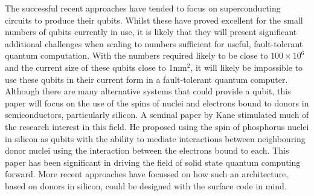 The successful recent approaches have tended to focus on superconducting circuits to produce their qubits. 
Whilst these have proved excellent for the small numbers of qubits currently in use, it is likely that they will present significant additional challenges when scaling to numbers sufficient for useful, fault-tolerant quantum computation.
With the numbers required likely to be close to $100 \times 10^6$ and the current size of these qubits close to 1mm$^2$, it will likely be impossible to use these qubits in their current form in a fault-tolerant quantum computer.
\\
Although there are many alternative systems that could provide a qubit, this paper will focus on the use of the spins of nuclei and electrons bound to donors in semiconductors, particularly silicon. 
A seminal paper by Kane \cite{Kane1998} stimulated much of the research interest in this field. 
He proposed using the spin of phosphorus nuclei in silicon as qubits with the ability to mediate interactions between neighbouring donor nuclei using the interaction between the electrons bound to each. 
This paper has been significant in driving the field of solid state quantum computing forward.
More recent approaches have focussed on how such an architecture, based on donors in silicon, could be designed with the surface code in mind. 

